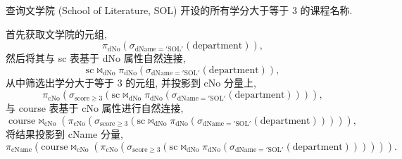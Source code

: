 \documentclass[10pt,UTF8]{book} %
\begin{document}
\begin{example}
    查询文学院 (School of Literature, SOL) 开设的所有学分大于等于 $3$
    的课程名称.
    \begin{sol}
        首先获取文学院的元组,
        \[ \pi_\mathrm{dNo} \left(
            \sigma_\mathrm{dName='SOL'} \left(\mathrm{department}\right)
        \right), \]
        然后将其与 sc 表基于 dNo 属性自然连接,
        \[ \mathrm{sc} \Join_\mathrm{dNo} \pi_\mathrm{dNo} \left(
            \sigma_\mathrm{dName='SOL'} \left(\mathrm{department}\right)
        \right), \]
        从中筛选出学分大于等于 3 的元组,
        并投影到 cNo 分量上,
        \[ \pi_\mathrm{cNo} \left(
            \sigma_\mathrm{score \geqslant 3} \left(
                \mathrm{sc} \Join_\mathrm{dNo} \pi_\mathrm{dNo} \left(
            \sigma_\mathrm{dName='SOL'} \left(\mathrm{department}\right)
        \right)
            \right)
        \right), \]
        与 course 表基于 cNo 属性进行自然连接,
        \[ \mathrm{course} \Join_\mathrm{cNo} \left(
            \pi_\mathrm{cNo} \left(
            \sigma_\mathrm{score \geqslant 3} \left(
                \mathrm{sc} \Join_\mathrm{dNo} \pi_\mathrm{dNo} \left(
            \sigma_\mathrm{dName='SOL'} \left(\mathrm{department}\right)
        \right)
            \right)
        \right)
        \right), \]
        将结果投影到 cName 分量,
        \[ \pi_\mathrm{cName} \left(
            \mathrm{course} \Join_\mathrm{cNo} \left(
            \pi_\mathrm{cNo} \left(
            \sigma_\mathrm{score \geqslant 3} \left(
                \mathrm{sc} \Join_\mathrm{dNo} \pi_\mathrm{dNo} \left(
            \sigma_\mathrm{dName='SOL'} \left(\mathrm{department}\right)
        \right)
            \right)
        \right)
        \right)
        \right). \]
    \end{sol}
\end{example}
\end{document}
